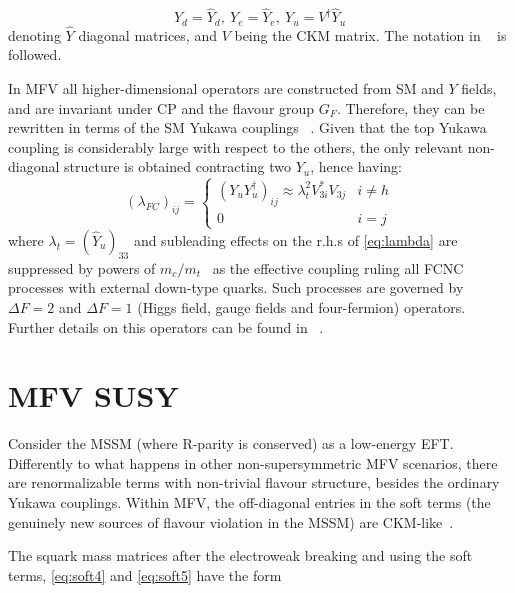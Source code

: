 \begin{equation}
Y_d = \hat{Y}_d, \ Y_e = \hat{Y}_e, \ Y_u = V^{\dagger}\hat{Y}_u
\end{equation}
denoting $\hat{Y}$ diagonal matrices, and $V$ being the CKM matrix. The notation in ~\cite{DAmbrosio:2002vsn} is followed.  

In MFV all higher-dimensional operators are constructed from SM and $Y$ fields, and are invariant under CP and the flavour group $G_F$. Therefore, they can be rewritten in terms of the SM Yukawa couplings ~\cite{Altmannshofer:2007cs}. Given that the top Yukawa coupling is considerably large with respect to the others, the only relevant non-diagonal structure  is obtained contracting two $Y_u$, hence having:
\begin{equation}
\left(\lambda_{FC}\right)_{ij} = \left\{\begin{matrix}
\left( Y_u Y_u^{\dagger} \right)_{ij} \approx \lambda_t^2 V_{3i}^* V_{3j} & i \neq h\\ 
0 & i = j 
\end{matrix}\right.
\label{eq:lambda}
\end{equation}
where $\lambda_t = (\hat{Y}_u)_{33}$ and subleading effects on the r.h.s of \ref{eq:lambda} are suppressed by powers of $m_c/m_t$~\cite{Altmannshofer:2007cs} as the effective coupling ruling all FCNC processes with external down-type quarks. Such processes are governed by $\Delta F = 2$ and $\Delta F = 1$ (Higgs field, gauge fields and four-fermion) operators. Further details on this operators can be found in ~\cite{DAmbrosio:2002vsn}. 



\section{MFV SUSY}
\label{sec:MFVSUSY}
Consider the MSSM (where R-parity is conserved) as a low-energy EFT. Differently to what happens in other non-supersymmetric MFV scenarios, there are renormalizable terms with non-trivial flavour structure, besides the ordinary Yukawa couplings.
Within MFV, the off-diagonal entries in the soft terms (the genuinely new sources of flavour violation in the MSSM) are CKM-like~\cite{Altmannshofer:2007cs}.

The squark mass matrices after the electroweak breaking and using the soft terms, \ref{eq:soft4} and \ref{eq:soft5} have the form 

